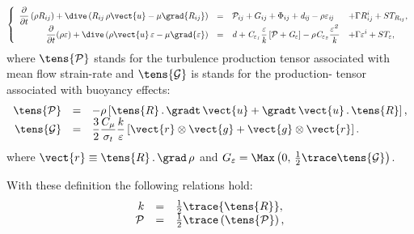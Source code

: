 \begin{equation}
\left\{
\begin{array}{rcll}
\displaystyle\frac{\partial }{\partial t} \left(\rho R_{ij} \right)
+\dive \left(R_{ij} \, \rho \vect{u}-\mu \grad{R_{ij}} \right) 
& = & \mathcal{P}_{ij}+G_{ij}+\Phi _{ij}+\mathit{{d}_{ij}
-\rho \varepsilon _{ij}} & \displaystyle+\Gamma R_{ij}^{i}+ST_{R_{ij}},
\\
\displaystyle\frac{\partial }{\partial t}(\rho \varepsilon )
+\dive\left(\rho \vect{u}\,\varepsilon -\mu \grad{\varepsilon}\right) 
& = & \displaystyle \mathit{{d}+C_{\varepsilon _{1}}\frac{\varepsilon }{k}\left[ \mathcal{P}%
+G_{\varepsilon }\right] -\rho C_{\varepsilon _{2}}\frac{\varepsilon ^{2}}{k}} 
& \displaystyle+\Gamma \varepsilon ^{i}+ST_{\varepsilon },
\end{array}%
\right.
\end{equation}
where
$\tens{\mathcal{P}}$ stands for the turbulence production tensor associated
with mean flow strain-rate and $\tens{\mathcal{G}}$ is stands for the
production- tensor associated with buoyancy effects:
\begin{equation}
\begin{array}{r c l}
\displaystyle \tens{ \mathcal{P}} & = & \displaystyle-\rho \left[ \tens{R} \, . \, \gradt \, \vect{u} 
+ \gradt \, \vect{u}  \, . \, \tens{R}\right], \\
\tens{ \mathcal{G}} & = &
\displaystyle \frac{3}{2}\frac{C_{\mu }}{\sigma _{t}}
\frac{k}{\varepsilon }
\left[\vect{r} \otimes \vect{g} +\vect{g} \otimes \vect{r}  \right].
\end{array}
\end{equation}
where $ \vect{r} \equiv \tens{R} \, . \, \grad \, \rho$ and 
$G_{\varepsilon }= \Max \left(0, \, \frac{1}{2}\trace \tens{\mathcal{G}}\right)$.

With these definition the following relations hold:
\begin{equation}
\begin{array}{r c l}
\displaystyle k &=&\frac{1}{2} \trace{\tens{R}}, \\
\mathcal{P} &=&\frac{1}{2} \trace \left( \tens{\mathcal{P}} \right) ,
\end{array}
\end{equation}

